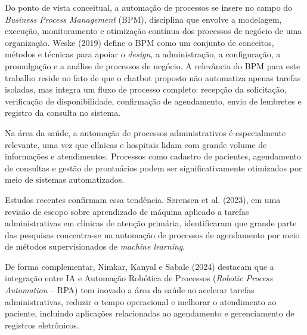 \documentclass[12pt,a4paper]{extarticle}
\begin{document}
Do ponto de vista conceitual, a automação de processos se insere no campo do \textit{Business Process Management} (BPM), disciplina que envolve a modelagem, execução, monitoramento e otimização contínua dos processos de negócio de uma organização. Weske (2019) define o BPM como um conjunto de conceitos, métodos e técnicas para apoiar o \textit{design}, a administração, a configuração, a promulgação e a análise de processos de negócio. A relevância do BPM para este trabalho reside no fato de que o chatbot proposto não automatiza apenas tarefas isoladas, mas integra um fluxo de processo completo: recepção da solicitação, verificação de disponibilidade, confirmação de agendamento, envio de lembretes e registro da consulta no sistema.

Na área da saúde, a automação de processos administrativos é especialmente relevante, uma vez que clínicas e hospitais lidam com grande volume de informações e atendimentos. Processos como cadastro de pacientes, agendamento de consultas e gestão de prontuários podem ser significativamente otimizados por meio de sistemas automatizados.

Estudos recentes confirmam essa tendência. Sørensen et al. (2023), em uma revisão de escopo sobre aprendizado de máquina aplicado a tarefas administrativas em clínicas de atenção primária, identificaram que grande parte das pesquisas concentra-se na automação de processos de agendamento por meio de métodos supervisionados de \textit{machine learning}.

De forma complementar, Nimkar, Kanyal e Sabale (2024) destacam que a integração entre IA e Automação Robótica de Processos (\textit{Robotic Process Automation} -- RPA) tem inovado a área da saúde ao acelerar tarefas administrativas, reduzir o tempo operacional e melhorar o atendimento ao paciente, incluindo aplicações relacionadas ao agendamento e gerenciamento de registros eletrônicos.

\end{document}
